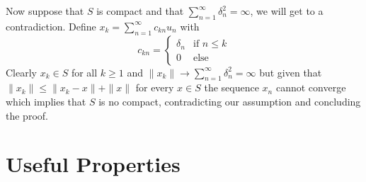 \documentclass{article}
\begin{document}
\begin{exercise}
\bigbreak

Now suppose that $S$ is compact and that $\sum_{n=1}^{\infty} \delta_n^2 = \infty $, we will get to a contradiction. Define $x_k = \sum_{n=1}^{\infty} c_{kn}u_n $ with
\[
    c_{kn} = 
    \begin{cases}
        \delta_n & \text{if } n \le k \\
        0 & \text{else}
    \end{cases}
\]
Clearly $x_k \in S$ for all $k \ge 1$  and $\|x_k\| \rightarrow \sum_{n=1}^{\infty} \delta_n^2 = \infty$ but given that $\|x_k\| \le \|x_k-x\| + \|x\|$ for every $x \in S$ the sequence $x_n$ cannot converge which implies that $S$ is no compact, contradicting our assumption and concluding the proof.  
\end{exercise}

\section*{Useful Properties}
\end{document}

